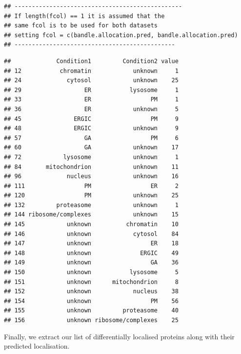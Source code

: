 \documentclass[9pt,a4paper,]{extarticle}
\begin{document}
\begin{verbatim}
## ------------------------------------------------
## If length(fcol) == 1 it is assumed that the
## same fcol is to be used for both datasets
## setting fcol = c(bandle.allocation.pred, bandle.allocation.pred)
## ----------------------------------------------
\end{verbatim}

\begin{verbatim}
##             Condition1         Condition2 value
## 12           chromatin            unknown     1
## 24             cytosol            unknown    25
## 29                  ER           lysosome     1
## 33                  ER                 PM     1
## 36                  ER            unknown     5
## 45               ERGIC                 PM     9
## 48               ERGIC            unknown     9
## 57                  GA                 PM     6
## 60                  GA            unknown    17
## 72            lysosome            unknown     1
## 84       mitochondrion            unknown    11
## 96             nucleus            unknown    16
## 111                 PM                 ER     2
## 120                 PM            unknown    25
## 132         proteasome            unknown     1
## 144 ribosome/complexes            unknown    15
## 145            unknown          chromatin    10
## 146            unknown            cytosol    84
## 147            unknown                 ER    18
## 148            unknown              ERGIC    49
## 149            unknown                 GA    36
## 150            unknown           lysosome     5
## 151            unknown      mitochondrion     8
## 152            unknown            nucleus    38
## 154            unknown                 PM    56
## 155            unknown         proteasome    40
## 156            unknown ribosome/complexes    25
\end{verbatim}

Finally, we extract our list of differentially localised proteins along with
their predicted localisation.
\end{document}

